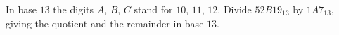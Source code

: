 In base $13$ the digits $A$, $B$, $C$ stand for $10$, $11$, $12$. Divide $52B19_{13}$ by $1A7_{13}$, giving the quotient and the remainder in base $13$.
